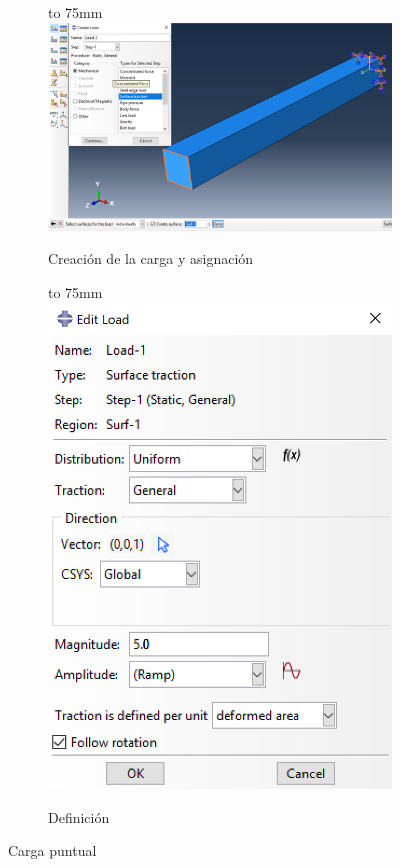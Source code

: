 \documentclass[spanish,a4paper,12pt]{article}
\def\imagebox#1#2{\vtop to #1{\null\hbox{#2}\vfill}}
\begin{document}
\clearpage
\begin{figure}[h!tp]
\centering
\captionsetup[subfigure]{justification=centering,singlelinecheck=false}
  \begin{subfigure}[b]{0.74\textwidth}
  \hspace{0mm}
    \imagebox{75mm}{\includegraphics[scale=0.32]{capturas/load4.png}}
    \caption{Creación de la carga y asignación\label{fig:load3a}}
  \end{subfigure}
  \begin{subfigure}[b]{0.25\textwidth}
  \hspace{0mm}
    \imagebox{75mm}{\includegraphics[scale=0.46]{capturas/load5.png}}
    \caption{Definición\label{fig:load3b}}
  \end{subfigure}
\caption{Carga puntual}
\label{fig:load3}
\end{figure}
\end{document}
